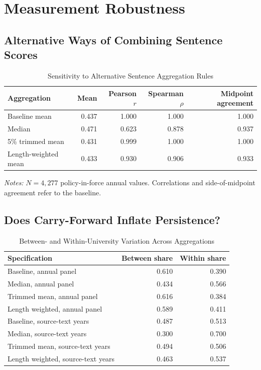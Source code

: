\documentclass[11pt]{article}
\begin{document}
\section{Measurement Robustness}
\subsection{Alternative Ways of Combining Sentence Scores}
\begin{table}[htbp]\centering\caption{Sensitivity to Alternative Sentence Aggregation Rules}\small\begin{tabular}{lrrrr}\toprule Aggregation&Mean&Pearson $r$&Spearman $\rho$&Midpoint agreement\\\midrule Baseline mean&0.437&1.000&1.000&1.000\\Median&0.471&0.623&0.878&0.937\\5\% trimmed mean&0.431&0.999&1.000&1.000\\Length-weighted mean&0.433&0.930&0.906&0.933\\\bottomrule\end{tabular}\par\small\emph{Notes:} $N=4,277$ policy-in-force annual values. Correlations and side-of-midpoint agreement refer to the baseline.\end{table}
\subsection{Does Carry-Forward Inflate Persistence?}
\begin{table}[htbp]\centering\caption{Between- and Within-University Variation Across Aggregations}\small\begin{tabular}{lrr}\toprule Specification&Between share&Within share\\\midrule Baseline, annual panel&0.610&0.390\\Median, annual panel&0.434&0.566\\Trimmed mean, annual panel&0.616&0.384\\Length weighted, annual panel&0.589&0.411\\Baseline, source-text years&0.487&0.513\\Median, source-text years&0.300&0.700\\Trimmed mean, source-text years&0.494&0.506\\Length weighted, source-text years&0.463&0.537\\\bottomrule\end{tabular}\end{table}
\end{document}
